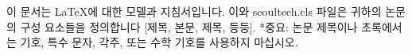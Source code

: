 
\begin{KoreanAbstract}
이 문서는 \LaTeX 에 대한 모델과 지침서입니다. 이와 seoultech.cls 파일은 귀하의 논문의 구성 요소들을 정의합니다 [제목, 본문, 제목, 등등]. *중요: 논문 제목이나 초록에서는 기호, 특수 문자, 각주, 또는 수학 기호를 사용하지 마십시오.
\end{KoreanAbstract}
